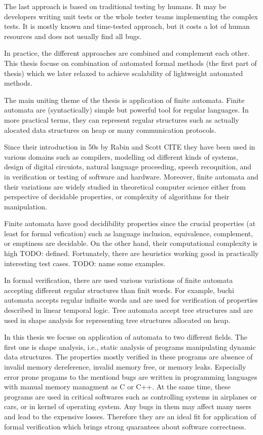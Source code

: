 The last approach is based on traditional testing by humans. It may be developers
writing unit tests or the whole tester teams implementing the complex tests.
It is mostly known and time-tested approach, but it costs a lot of human resources and
does not usually find all bugs.

In practice, the different approaches are combined and complement each other.
This thesis focuse on combination of automated formal methods (the first part of thesis)
which we later relaxed to achieve scalability of lightweight automated methods.

The main uniting theme of the thesis is application of finite automata.
Finite automata are (syntactically) simple but powerful tool for regular
languages. In more practical terms, they can represent regular structures
such as actually alocated data structures on heap or many communication protocols.

Since their introduction in 50s by Rabin and Scott CITE they have been used in
various domains such as compilers, modelling od different kinds of systems,
design of digital circuiots, natural language proceeding, speech recoqnition,
and in verification or testing of software and hardware.
Moreover, finite automata and their variations are widely studied in theoretical computer science either
from perspective of decidable properties, or complexity of algorithms for their manipulation.

Finite automata have good decidibility properties since the crucial properties (at least for formal vefication)
such as language inclusion, equivalence, complement, or emptiness are decidable.
On the other hand, their computational complexity is high
TODO: defined.
Fortunately, there are heuristics working good in practically interesting test cases.
TODO: name some examples.

In formal verification, there are used various variations of finite automata
accepting different regular structures than finit words.
For example, buchi automata accepts regular infinite words and are used
for verification of properties described in linear temporal logic.
Tree automata accept tree structures and are used in shape analysis
for representing tree structures allocated on heap.

In this thesis we focuse on application of automata to two different fields.
The first one is shape analysis, i.e., static analysis of programs manipulating
dynamic data structures.
The properties mostly verified in these programs are absence of invalid memory
dereference, invalid memory free, or memory leaks.
Especially error prone progams to the mentiond bugs are written in programming
languages with manual memory managment as C or C++.
At the same time, these programs are used in critical softwares such as controlling
systems in airplanes or cars, or in kernel of operating system.
Any bugs in them may affect many users and lead to the expensive losses.
Therefore they are an ideal fit for application of formal verification which
brings strong quarantees about software correctness.


